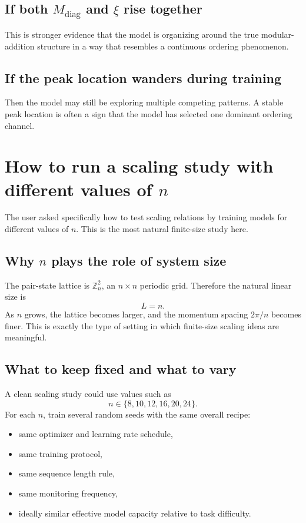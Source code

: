 \documentclass[11pt]{article}
\newcommand{\Zn}{\mathbb{Z}_n}
\newcommand{\diag}{\mathrm{diag}}
\begin{document}
\subsection{If both $M_{\diag}$ and $\xi$ rise together}

This is stronger evidence that the model is organizing around the true modular-addition structure in a way that resembles a continuous ordering phenomenon.

\subsection{If the peak location wanders during training}

Then the model may still be exploring multiple competing patterns. A stable peak location is often a sign that the model has selected one dominant ordering channel.

\section{How to run a scaling study with different values of $n$}

The user asked specifically how to test scaling relations by training models for different values of $n$. This is the most natural finite-size study here.

\subsection{Why $n$ plays the role of system size}

The pair-state lattice is $\Zn^2$, an $n \times n$ periodic grid. Therefore the natural linear size is
\begin{equation}
    L = n.
\end{equation}
As $n$ grows, the lattice becomes larger, and the momentum spacing $2\pi/n$ becomes finer. This is exactly the type of setting in which finite-size scaling ideas are meaningful.

\subsection{What to keep fixed and what to vary}

A clean scaling study could use values such as
\begin{equation}
    n \in \{8,10,12,16,20,24\}.
\end{equation}
For each $n$, train several random seeds with the same overall recipe:
\begin{itemize}
    \item same optimizer and learning rate schedule,
    \item same training protocol,
    \item same sequence length rule,
    \item same monitoring frequency,
    \item ideally similar effective model capacity relative to task difficulty.
\end{itemize}
\end{document}
